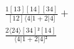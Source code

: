 \documentclass[varwidth, border=5pt]{standalone}
\begin{document}
\begin{my}
$\begin{gathered}
\scriptscriptstyle\frac{1[13][14][34]}{[12]⟨4|1+2|4]} +\\
\scriptscriptstyle\frac{2⟨24⟩[34]²[14]}{⟨4|1+2|4]²} \phantom{+}
\end{gathered}$
\end{my}
\end{document}
